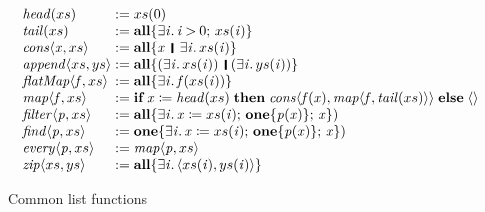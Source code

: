 \documentclass[acmsmall,review,dvipsnames]{acmart}
\newcommand{\Varid}[1]{\mathit{#1}}
\begin{document}
\begin{figure}
  $$
  \begin{array}{l}
    \begin{array}{l@{\;}l}
      \ensuremath{\Varid{head}( xs )} & :=  \ensuremath{ xs (\mathrm{0})} \\
      \ensuremath{\Varid{tail}( xs )} & :=  \ensuremath{\textbf{all}\{\exists\Varid{i}.\,\Varid{i}\mathbin{>}\mathrm{0};\, xs (\Varid{i})\}} \\
      \ensuremath{\Varid{cons}\langle\Varid{x}, xs \rangle} & :=  \ensuremath{\textbf{all}\{\Varid{x}\hspace{1mm}\mathop{\rule[-0.3mm]{0.5mm}{2.5mm}}\hspace{1mm}\exists\Varid{i}.\, xs (\Varid{i})\}} \\
      \ensuremath{\Varid{append}\langle xs , ys \rangle} & :=  \ensuremath{\textbf{all}\{(\exists\Varid{i}.\, xs (\Varid{i}))\hspace{1mm}\mathop{\rule[-0.3mm]{0.5mm}{2.5mm}}\hspace{1mm}(\exists\Varid{i}.\, ys (\Varid{i}))\}} \\
      \ensuremath{\Varid{flatMap}\langle\Varid{f}, xs \rangle} & := \ensuremath{\textbf{all}\{\exists\Varid{i}.\,\Varid{f}( xs (\Varid{i}))\}} \\
      \ensuremath{\Varid{map}\langle\Varid{f}, xs \rangle} & :=  \ensuremath{\textbf{if}\;\Varid{x}\mathrel{\coloneqq}\Varid{head}( xs )\;\textbf{then}\;\Varid{cons}\langle\Varid{f}(\Varid{x}),\Varid{map}\langle\Varid{f},\Varid{tail}( xs )\rangle\rangle\;\textbf{else}\;\langle\rangle} \\
      \ensuremath{\Varid{filter}\langle\Varid{p}, xs \rangle} & :=  \ensuremath{\textbf{all}\{\exists\Varid{i}.\,\Varid{x}\mathrel{\coloneqq} xs (\Varid{i});\,\textbf{one}\{\Varid{p}(\Varid{x})\};\,\Varid{x}\})} \\
      \ensuremath{\Varid{find}\langle\Varid{p}, xs \rangle} & :=  \ensuremath{\textbf{one}\{\exists\Varid{i}.\,\Varid{x}\mathrel{\coloneqq} xs (\Varid{i});\,\textbf{one}\{\Varid{p}(\Varid{x})\};\,\Varid{x}\})} \\
      \ensuremath{\Varid{every}\langle\Varid{p}, xs \rangle} & :=  \ensuremath{\Varid{map}\langle\Varid{p}, xs \rangle} \\
      \ensuremath{\Varid{zip}\langle xs , ys \rangle} & := \ensuremath{\textbf{all}\{\exists\Varid{i}.\,\langle{} xs (\Varid{i}), ys (\Varid{i})\rangle\}} \\
    \end{array}
  \end{array}
  $$
\caption{Common list functions} \label{fig:list-functions}
\end{figure}
\end{document}
